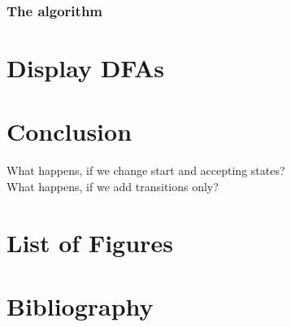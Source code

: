 \documentclass[a4paper, oneside, 11pt]{report}
\begin{document}
\subsection{The algorithm}




\chapter{Display DFAs}




\chapter{Conclusion}

What happens, if we change start and accepting states? \\
What happens, if we add transitions only?


\appendix
\chapter{List of Figures}
\chapter{Bibliography}
\end{document}
